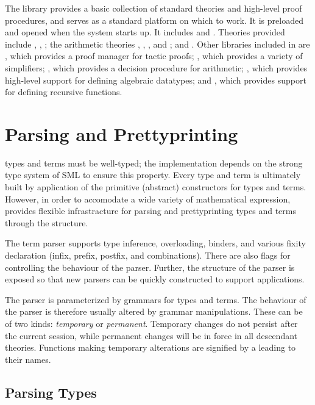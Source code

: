 {The  library provides a basic collection of standard
theories and high-level proof procedures, and serves as a standard
platform on which to work. It is preloaded and opened when the \HOL{}
system starts up. It includes  and
. Theories provided include ,
, ; the arithmetic theories
, , ,
and ; and . Other libraries
included in  are , which provides
a proof manager for tactic proofs; , which provides
a variety of simplifiers; , which provides a decision
procedure for arithmetic; , which provides
high-level support for defining algebraic datatypes; and ,
which provides support for defining recursive functions.


\section{Parsing and Prettyprinting}

\HOL{} types and terms must be well-typed; the \HOL{} implementation
depends on the strong type system of SML to ensure this property.
Every type and term is ultimately built by application of the
primitive (abstract) constructors for types and terms. However, in
order to accomodate a wide variety of mathematical expression,
\HOL{} provides flexible infrastracture for parsing and prettyprinting
types and terms through the  structure.

The term parser supports type inference, overloading, binders, and
various fixity declaration (infix, prefix, postfix, and
combinations). There are also flags for controlling the behaviour
of the parser. Further, the structure of the parser is exposed so that
new parsers can be quickly constructed to support applications.

The parser is parameterized by grammars for types and terms. The
behaviour of the parser is therefore usually altered by grammar
manipulations. These can be of two kinds: \emph{temporary} or
\emph{permanent}.  Temporary changes do not persist after the current
session, while permanent changes will be in force in all descendant
theories.  Functions making temporary alterations are signified
by a leading  to their names.

\subsection{Parsing Types}

}

